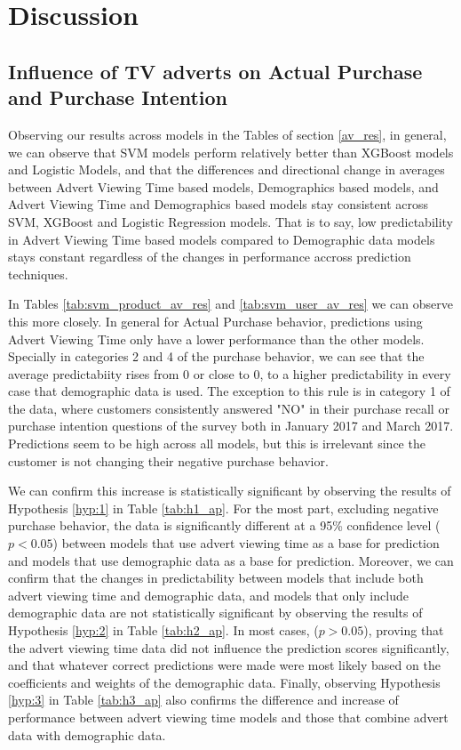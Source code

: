 \documentclass[review]{elsarticle}
\begin{document}
\section{Discussion}
\label{discussion}

\subsection{Influence of TV adverts on Actual Purchase and Purchase Intention}
\label{disc_ap_pi}

Observing our results across models in the Tables of section \ref{av_res}, in general, we can observe that SVM models perform relatively better than XGBoost models and Logistic Models, and that the differences and directional change in averages between Advert Viewing Time based models, Demographics based models, and Advert Viewing Time and Demographics based models stay consistent across SVM, XGBoost and Logistic Regression models. That is to say, low predictability in Advert Viewing Time based models compared to Demographic data models stays constant regardless of the changes in performance accross prediction techniques.
  
In Tables \ref{tab:svm_product_av_res} and \ref{tab:svm_user_av_res} we can observe this more closely. In general for Actual Purchase behavior, predictions using Advert Viewing Time only have a lower performance than the other models. Specially in categories 2 and 4 of the purchase behavior, we can see that the average predictabiity rises from 0 or close to 0, to a higher predictability in every case that demographic data is used. The exception to this rule is in category 1 of the data, where customers consistently answered "NO" in their purchase recall or purchase intention questions of the survey both in January 2017 and March 2017. Predictions seem to be high across all models, but this is irrelevant since the customer is not changing their negative purchase behavior.

We can confirm this increase is statistically significant by observing the results of Hypothesis \ref{hyp:1} in Table \ref{tab:h1_ap}. For the most part, excluding negative purchase behavior, the data is significantly different at a 95\% confidence level (\(p<0.05\)) between models that use advert viewing time as a base for prediction and models that use demographic data as a base for prediction. Moreover, we can confirm that the changes in predictability between models that include both advert viewing time and demographic data, and models that only include demographic data are not statistically significant by observing the results of Hypothesis \ref{hyp:2} in Table \ref{tab:h2_ap}. In most cases, (\(p>0.05\)), proving that the advert viewing time data did not influence the prediction scores significantly, and that whatever correct predictions were made were most likely based on the coefficients and weights of the demographic data. Finally, observing Hypothesis \ref{hyp:3} in Table \ref{tab:h3_ap} also confirms the difference and increase of performance between advert viewing time models and those that combine advert data with demographic data. 
\end{document}

